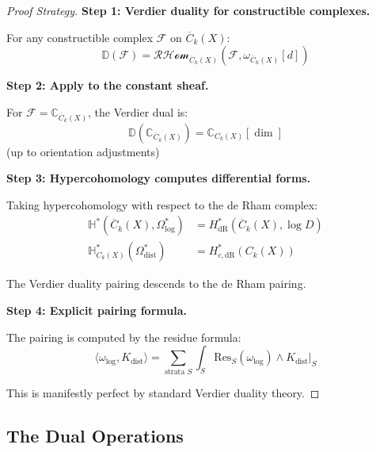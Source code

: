 \begin{proof}[Proof Strategy]
\textbf{Step 1: Verdier duality for constructible complexes.}

For any constructible complex $\mathcal{F}$ on $\overline{C}_k(X)$:
$$\mathbb{D}(\mathcal{F}) = \mathcal{RHom}_{\overline{C}_k(X)}(\mathcal{F}, \omega_{\overline{C}_k(X)}[d])$$

\textbf{Step 2: Apply to the constant sheaf.}

For $\mathcal{F} = \mathbb{C}_{\overline{C}_k(X)}$, the Verdier dual is:
$$\mathbb{D}(\mathbb{C}_{\overline{C}_k(X)}) = \mathbb{C}_{C_k(X)}[\dim]$$
(up to orientation adjustments)

\textbf{Step 3: Hypercohomology computes differential forms.}

Taking hypercohomology with respect to the de Rham complex:
\begin{align*}
\mathbb{H}^*(\overline{C}_k(X), \Omega^*_{\log}) &= H^*_{\text{dR}}(\overline{C}_k(X), \log D)\\
\mathbb{H}^*_{C_k(X)}(\Omega^*_{\text{dist}}) &= H^*_{c,\text{dR}}(C_k(X))
\end{align*}

The Verdier duality pairing descends to the de Rham pairing.

\textbf{Step 4: Explicit pairing formula.}

The pairing is computed by the residue formula:
$$\langle \omega_{\text{log}}, K_{\text{dist}} \rangle = \sum_{\text{strata } S} \int_S \text{Res}_S(\omega_{\text{log}}) \wedge K_{\text{dist}}|_S$$

This is manifestly perfect by standard Verdier duality theory.
\end{proof}

\subsection{The Dual Operations}

